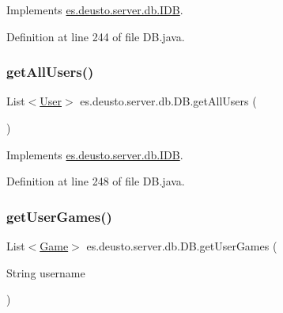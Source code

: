 Implements \hyperlink{interfacees_1_1deusto_1_1server_1_1db_1_1_i_d_b_a76af81d4bb71c81490da92d67c5b6d03}{es.\+deusto.\+server.\+db.\+I\+DB}.



Definition at line 244 of file D\+B.\+java.

\mbox{\label{classes_1_1deusto_1_1server_1_1db_1_1_d_b_a245d98f8d670e29804a28d60daa7835b}} 
\subsubsection{\texorpdfstring{get\+All\+Users()}{getAllUsers()}}
{\footnotesize\ttfamily List$<$\hyperlink{classes_1_1deusto_1_1server_1_1db_1_1data_1_1_user}{User}$>$ es.\+deusto.\+server.\+db.\+D\+B.\+get\+All\+Users (\begin{DoxyParamCaption}{ }\end{DoxyParamCaption})}



Implements \hyperlink{interfacees_1_1deusto_1_1server_1_1db_1_1_i_d_b_ab2893cf6b112e1789b5a9e62f5156f6a}{es.\+deusto.\+server.\+db.\+I\+DB}.



Definition at line 248 of file D\+B.\+java.

\mbox{\label{classes_1_1deusto_1_1server_1_1db_1_1_d_b_a1c471589284782e7ff1190f2b6c2369e}} 
\subsubsection{\texorpdfstring{get\+User\+Games()}{getUserGames()}}
{\footnotesize\ttfamily List$<$\hyperlink{classes_1_1deusto_1_1server_1_1db_1_1data_1_1_game}{Game}$>$ es.\+deusto.\+server.\+db.\+D\+B.\+get\+User\+Games (\begin{DoxyParamCaption}\item[{String}]{username }\end{DoxyParamCaption})}



